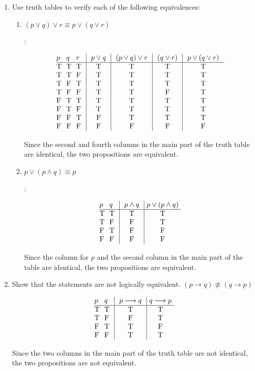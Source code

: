 \documentclass[11pt]{amsart}
\begin{document}
\begin{enumerate}
\item Use truth tables to verify each of the following equivalences:

\begin{enumerate}

\item $(p\vee q)\vee r \equiv p\vee (q\vee r)$

:

$$\vbox{\offinterlineskip
\halign { \strut # & # & # & \vrule ~~# & \vrule ~~# & \vrule ~~# & \vrule ~~# \cr
$p$ & $q$ & $r$ & $p\vee q$ & $(p\vee q)\vee r$ & $(q\vee r)$ & $p\vee (q\vee r)$ \cr
\noalign{\hrule}
T   &  T   &  T   &  T  &  T  &  T  &  T \cr
T   &  T   &  F   &  T  &  T  &  T  &  T \cr
T   &  F   &  T   &  T  &  T  &  T  &  T \cr
T   &  F   &  F   &  T  &  T  &  F  &  T \cr
F   &  T   &  T   &  T  &  T  &  T  &  T \cr
F   &  T   &  F   &  T  &  T  &  T  &  T \cr
F   &  F   &  T   &  F  &  T  &  T  &  T \cr
F   &  F   &  F   &  F  &  F  &  F  &  F \cr
}}$$

Since the second and fourth columns in the main part of the truth table are identical, the two propositions
are equivalent.

\item $p\lor(p\land q)\equiv p$

:

$$\vbox{\offinterlineskip
\halign { \strut # & # & \vrule ~~# & \vrule ~#\cr
$p$ & $q$ & $p\land q$ & $p\lor(p\land q)$ \cr
\noalign{\hrule}
T   &  T   &  T  &  T \cr
T   &  F   &  F  &  T \cr
F   &  T   &  F  &  F \cr
F   &  F   &  F  &  F \cr
}}$$

Since the column for $p$ and the second column in the main part of the table are identical, the two
propositions are equivalent.

\end{enumerate}


\item Show that the statements are not logically equivalent. 
 $(p\longrightarrow q)\not\equiv (q\longrightarrow p)$

$$\vbox{\offinterlineskip
\halign { \strut # & # & \vrule ~~# & \vrule ~#\cr
$p$ & $q$ & $p\longrightarrow q$ & $q\longrightarrow p$ \cr
\noalign{\hrule}
T   &  T   &  T  &  T \cr
T   &  F   &  F  &  T \cr
F   &  T   &  T  &  F \cr
F   &  F   &  T  &  T \cr
}}$$

Since the two columns in the main part of the truth table are not identical, the two propositions are not equivalent.



\end{enumerate}
\end{document}
